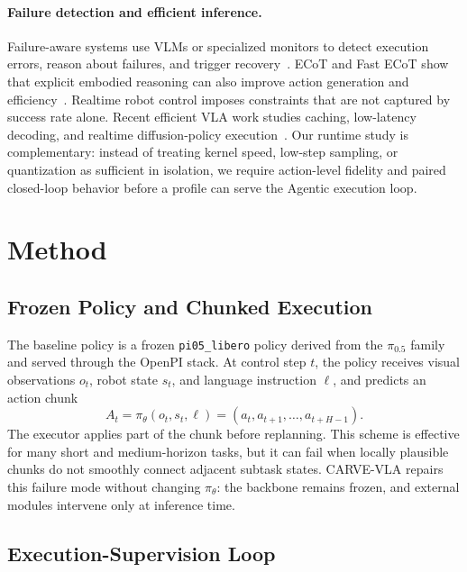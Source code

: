 \documentclass[runningheads]{waica}
\newcommand{\method}{CARVE-VLA}
\newcommand{\pizero}{$\pi_{0.5}$}
\begin{document}
\paragraph{Failure detection and efficient inference.}
Failure-aware systems use VLMs or specialized monitors to detect execution errors, reason about failures, and trigger recovery~\cite{duan2024aha,grislain2025ifailsense,lin2025failsafe}.
ECoT and Fast ECoT show that explicit embodied reasoning can also improve action generation and efficiency~\cite{zawalski2024ecot,duan2025fastecot}.
Realtime robot control imposes constraints that are not captured by success rate alone.
Recent efficient VLA work studies caching, low-latency decoding, and realtime diffusion-policy execution~\cite{xu2025vlacache,guan2025efficientvlasurvey,niu2026realtimevlaflash,yang2026realtimevlav2}.
Our runtime study is complementary: instead of treating kernel speed, low-step
sampling, or quantization as sufficient in isolation, we require action-level
fidelity and paired closed-loop behavior before a profile can serve the
Agentic execution loop.

\section{Method}
\label{sec:method}

\subsection{Frozen Policy and Chunked Execution}

The baseline policy is a frozen \texttt{pi05\_libero} policy derived from the \pizero{} family and served through the OpenPI stack.
At control step $t$, the policy receives visual observations $o_t$, robot state $s_t$, and language instruction $\ell$, and predicts an action chunk
\begin{equation}
A_t = \pi_\theta(o_t,s_t,\ell) =
(a_t,a_{t+1},\ldots,a_{t+H-1}).
\end{equation}
The executor applies part of the chunk before replanning.
This scheme is effective for many short and medium-horizon tasks, but it can fail when locally plausible chunks do not smoothly connect adjacent subtask states.
\method{} repairs this failure mode without changing $\pi_\theta$: the backbone remains frozen, and external modules intervene only at inference time.

\subsection{Execution-Supervision Loop}
\end{document}
